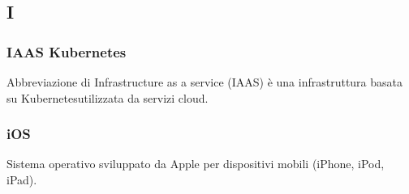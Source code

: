 \subsection*{\textbf{\hfill \Huge{I} \hfill}} 
\subsubsection*{IAAS Kubernetes}
Abbreviazione di Infrastructure as a service (IAAS) è una infrastruttura basata su Kubernetes\glo utilizzata da servizi cloud.
\subsubsection*{iOS}
Sistema operativo sviluppato da Apple per dispositivi mobili (iPhone, iPod, iPad).